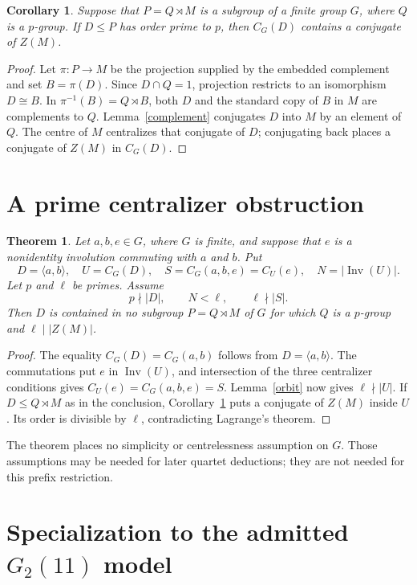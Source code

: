 \documentclass[11pt]{article}
\newtheorem{theorem}[lemma]{Theorem}
\newtheorem{corollary}[lemma]{Corollary}
\theoremstyle{remark}\newtheorem{remark}[lemma]{Remark}
\newcommand{\Inv}{\operatorname{Inv}}
\newcommand{\gen}[1]{\langle #1\rangle}
\begin{document}
\begin{corollary}\label{levi}
Suppose that $P=Q\rtimes M$ is a subgroup of a finite group $G$,
where $Q$ is a $p$-group. If $D\leq P$ has order prime to $p$,
then $C_G(D)$ contains a conjugate of $Z(M)$.
\end{corollary}
\begin{proof}
Let $\pi:P\to M$ be the projection supplied by the embedded complement
and set $B=\pi(D)$. Since $D\cap Q=1$, projection restricts to an
isomorphism $D\cong B$. In $\pi^{-1}(B)=Q\rtimes B$, both $D$
and the standard copy of $B$ in $M$ are complements to $Q$.
Lemma~\ref{complement} conjugates $D$ into $M$ by an element of $Q$.
The centre of $M$ centralizes that conjugate of $D$; conjugating back
places a conjugate of $Z(M)$ in $C_G(D)$.
\end{proof}

\section{A prime centralizer obstruction}

\begin{theorem}\label{general}
Let $a,b,e\in G$, where $G$ is finite, and suppose that $e$ is a
nonidentity involution commuting with $a$ and $b$. Put
\[
 D=\gen{a,b},\quad U=C_G(D),\quad
 S=C_G(a,b,e)=C_U(e),\quad N=|\Inv(U)|.
\]
Let $p$ and $\ell$ be primes. Assume
\[
 p\nmid |D|,\qquad N<\ell,\qquad \ell\nmid |S|.
\]
Then $D$ is contained in no subgroup $P=Q\rtimes M$ of $G$ for
which $Q$ is a $p$-group and $\ell\mid |Z(M)|$.
\end{theorem}
\begin{proof}
The equality $C_G(D)=C_G(a,b)$ follows from $D=\gen{a,b}$.
The commutations put $e$ in $\Inv(U)$, and intersection of the three
centralizer conditions gives $C_U(e)=C_G(a,b,e)=S$.
Lemma~\ref{orbit} now gives $\ell\nmid |U|$.
If $D\leq Q\rtimes M$ as in the conclusion, Corollary~\ref{levi}
puts a conjugate of $Z(M)$ inside $U$. Its order is divisible by
$\ell$, contradicting Lagrange's theorem.
\end{proof}

The theorem places no simplicity or centrelessness assumption on $G$.
Those assumptions may be needed for later quartet deductions; they are
not needed for this prefix restriction.

\section{Specialization to the admitted $G_2(11)$ model}
\end{document}
